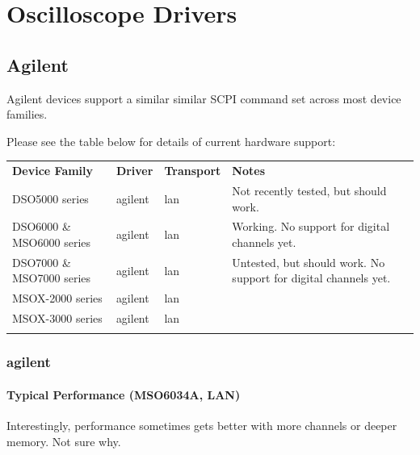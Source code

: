 \chapter{Oscilloscope Drivers}
\label{sec:drivers}

\section{Agilent}

Agilent devices support a similar similar SCPI command set across most device families.

Please see the table below for details of current hardware support:

\begin{tabularx}{16cm}{lllX}
\thickhline
\textbf{Device Family} & \textbf{Driver} & \textbf{Transport} & \textbf{Notes} \\
\thickhline
DSO5000 series & agilent & lan & Not recently tested, but should work.\\
\thinhline
DSO6000 \& MSO6000 series & agilent & lan &  Working. No support for digital channels yet.\\
\thinhline
DSO7000 \& MSO7000 series & agilent & lan & Untested, but should work. No support for digital channels yet.\\
\thinhline
MSOX-2000 series & agilent & lan \\
\thinhline
MSOX-3000 series & agilent & lan \\
\thickhline
\end{tabularx}

\subsection{agilent}

\subsubsection{Typical Performance (MSO6034A, LAN)}

Interestingly, performance sometimes gets better with more channels or deeper memory. Not sure why.

